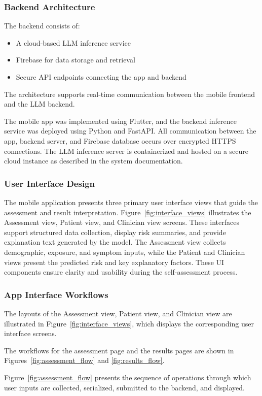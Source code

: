 \subsubsection{Backend Architecture}
The backend consists of:
\begin{itemize}
    \item A cloud-based LLM inference service
    \item Firebase for data storage and retrieval
    \item Secure API endpoints connecting the app and backend
\end{itemize}
The architecture supports real-time communication between the mobile frontend and the LLM backend.

The mobile app was implemented using Flutter, and the backend inference service was deployed using Python and FastAPI. All communication between the app, backend server, and Firebase database occurs over encrypted HTTPS connections. The LLM inference server is containerized and hosted on a secure cloud instance as described in the system documentation.

\subsubsection{User Interface Design}
The mobile application presents three primary user interface views that guide the assessment and result interpretation. Figure~\ref{fig:interface_views} illustrates the Assessment view, Patient view, and Clinician view screens. These interfaces support structured data collection, display risk summaries, and provide explanation text generated by the model. The Assessment view collects demographic, exposure, and symptom inputs, while the Patient and Clinician views present the predicted risk and key explanatory factors. These UI components ensure clarity and usability during the self-assessment process.

\subsubsection{App Interface Workflows}
The layouts of the Assessment view, Patient view, and Clinician view are illustrated in Figure~\ref{fig:interface_views}, which displays the corresponding user interface screens.

The workflows for the assessment page and the results pages are shown in Figures~\ref{fig:assessment_flow} and \ref{fig:results_flow}.

Figure~\ref{fig:assessment_flow} presents the sequence of operations through which user inputs are collected, serialized, submitted to the backend, and displayed.

